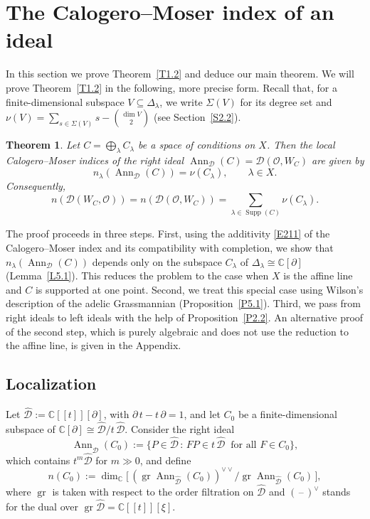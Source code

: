 \documentclass[11pt,reqno]{amsart}
\theoremstyle{plain}
\newtheorem{theorem}{Theorem}[section]
\theoremstyle{definition}
\theoremstyle{remark}
\numberwithin{equation}{section}
\newcommand{\cD}{\mathcal{D}}
\newcommand{\cO}{\mathcal{O}}
\newcommand{\C}{\mathbb{C}}
\newcommand{\del}{\partial}
\newcommand{\hD}{\widehat{\cD}}
\newcommand{\Dl}{\Delta_\lambda}
\DeclareMathOperator{\Ann}{Ann}
\DeclareMathOperator{\gr}{gr}
\DeclareMathOperator{\Supp}{Supp}
\begin{document}
\section{The Calogero--Moser index of an ideal}
\label{S5}

In this section we prove Theorem~\ref{T1.2} and deduce our main theorem. We will prove
Theorem~\ref{T1.2} in the following, more precise form. Recall that, for a finite-dimensional
subspace $V \subseteq \Dl$, we write $\Sigma(V)$ for its degree set and $\nu(V) = \sum_{s \in
\Sigma(V)} s - \binom{\dim V}{2}$ (see Section~\ref{S2.2}).

\begin{theorem}
\label{T5.1}
Let $C = \bigoplus_\lambda C_\lambda$ be a space of conditions on $X$. Then the local
Calogero--Moser indices of the right ideal $\Ann_{\cD}(C) = \cD(\cO, W_C)$ are given by
\[
  n_\lambda(\Ann_{\cD}(C)) = \nu(C_\lambda) , \qquad \lambda \in X .
\]
Consequently,
\[
  n(\cD(W_C, \cO)) = n(\cD(\cO, W_C)) = \sum_{\lambda \in \Supp(C)} \nu(C_\lambda) .
\]
\end{theorem}

The proof proceeds in three steps. First, using the additivity \eqref{E211} of the
Calogero--Moser index and its compatibility with completion, we show that $n_\lambda(\Ann_{\cD}(C))$
depends only on the subspace $C_\lambda$ of $\Dl \cong \C[\del]$ (Lemma~\ref{L5.1}). This reduces
the problem to the case when $X$ is the affine line and $C$ is supported at one point. Second, we
treat this special case using Wilson's description of the adelic Grassmannian
(Proposition~\ref{P5.1}). Third, we pass from right ideals to left ideals with the help of
Proposition~\ref{P2.2}. An alternative proof of the second step, which is purely algebraic and
does not use the reduction to the affine line, is given in the Appendix.

\subsection{Localization}
\label{S5.1}
Let $\hD := \C[[t]][\del]$, with $\del\, t - t\, \del = 1$, and let $C_0$ be a finite-dimensional
subspace of $\C[\del] \cong \hD/t\, \hD$. Consider the right ideal
\[
  \Ann_{\hD}(C_0) := \{ P \in \hD \, : \, F P \in t\, \hD \ \text{ for all } F \in C_0 \} ,
\]
which contains $t^m \hD$ for $m \gg 0$, and define
\begin{equation}
\label{E51}
  n(C_0) := \dim_{\C}\bigl[\, (\gr \Ann_{\hD}(C_0))^{\vee\vee} \big/ \gr \Ann_{\hD}(C_0) \,\bigr] ,
\end{equation}
where $\gr$ is taken with respect to the order filtration on $\hD$ and
$(\,\text{--}\,)^\vee$ stands for the dual over $\gr \hD = \C[[t]][\xi]$.
\end{document}
